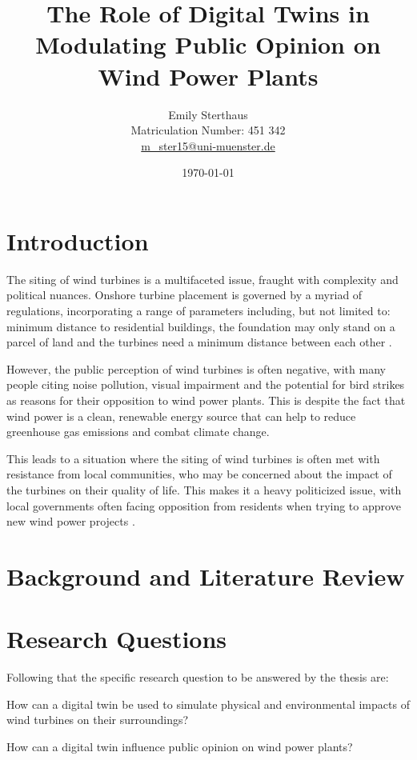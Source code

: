 \documentclass[11pt, titlepage, a4paper]{article}
\title{The Role of Digital Twins in Modulating Public Opinion on Wind Power Plants}
\author{Emily Sterthaus \\ Matriculation Number: 451 342 \\ \href{mailto:m_ster15@uni-muenster.de}{m\_ster15@uni-muenster.de}}
\affil{Institute of Geoinformatics, University of Münster}
\date{\today}
\begin{document}
\maketitle


\newpage
\begin{linenumbers}
    \section{Introduction}
    The siting of wind turbines is a multifaceted issue, fraught with complexity and political nuances. Onshore
    turbine placement is governed by a myriad of regulations, incorporating a range of parameters including, but not
    limited to: minimum distance to residential buildings, the foundation may only stand on a parcel of land and the
    turbines need a minimum distance between each other
    \cite{niedersachsischesministeriumfurumweltenergieundklimaschutzPlanungUndGenehmigung2021}.

    However, the public perception of wind turbines is often negative, with many people citing noise pollution, visual impairment and the potential for bird strikes as reasons for their opposition to wind power plants. This is despite the fact that wind power is a clean, renewable energy source that can help to reduce greenhouse gas emissions and combat climate change.

    This leads to a situation where the siting of wind turbines is often met with resistance from local communities, who may be concerned about the impact of the turbines on their quality of life. This makes it a heavy politicized issue, with local governments often facing opposition from residents when trying to approve new wind power projects \cite{kwasniewskiWindenergieVerhindertAntiWindkraftBewegung2021}.


    \section{Background and Literature Review}

    \section{Research Questions}
    Following that the specific research question to be answered by the thesis are:
    \begin{questions}
        \item How can a digital twin be used to simulate physical and environmental impacts of wind turbines on their surroundings?
        \item How can a digital twin influence public opinion on wind power plants?
    \end{questions}


\end{linenumbers}
\end{document}
